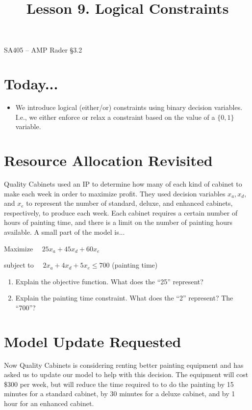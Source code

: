 \documentclass[11pt]{article}
\makeatletter
\theoremstyle{definition}
\newcommand{\answerbox}[3]{%
  \fbox{%
    \begin{minipage}[#1]{#2}
      \hfill\vspace{#3}
    \end{minipage}
  }
}
\newcommand{\answerboxone}[2]{%
  \answerbox{#1}{6.0in}{#2} 
}
\renewcommand{\maketitle}{
  \noindent SA405 -- AMP \hfill Rader \S 3.2 \\

  \begin{center}\Large{\textbf{\@title}}\end{center}
}
\makeatother
\begin{document}
  
\title{Lesson 9.  Logical Constraints}

\maketitle

\section{Today...}

\begin{itemize}
	\item  We introduce logical (either/or) constraints using binary decision variables.  I.e., we either enforce or relax a constraint based on the value of a $\{0,1\}$ variable.
\end{itemize}

\section{Resource Allocation Revisited}
Quality Cabinets used an IP to determine how many of each kind of cabinet to make each week in order to maximize profit.  They used decision variables $x_a, x_d,$ and $x_e$ to represent the number of standard, deluxe, and enhanced cabinets, respectively, to produce each week.  Each cabinet requires a certain number of hours of painting time, and there is a limit on the number of painting hours available.  A small part of the model is...

\begin{tcolorbox}
Maximize ~~$25x_a + 45x_d + 60x_e$

\smallskip
subject to ~~$2x_a + 4x_d + 5x_e \leq 700$ \hspace{1in} (painting time)
\end{tcolorbox}

\renewcommand{\labelenumi}{(\arabic{enumi})}
\begin{enumerate}
\item Explain the objective function.  What does the ``25'' represent?\\
\answerboxone{c}{1in}

\item Explain the painting time constraint.  What does the ``2'' represent?  The ``700''?\\
\answerboxone{c}{1in}
\end{enumerate}

\section{Model Update Requested}
Now Quality Cabinets is considering renting better painting equipment and has asked us to update our model to help with this decision.  The equipment will cost \$300 per week, but will reduce the time required to to do the painting by 15 minutes for a standard cabinet, by 30 minutes for a deluxe cabinet, and by 1 hour for an enhanced cabinet.
\end{document}
